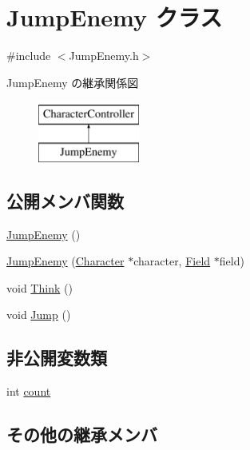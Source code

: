 \hypertarget{class_jump_enemy}{\section{Jump\+Enemy クラス}
\label{class_jump_enemy}
}


{\ttfamily \#include $<$Jump\+Enemy.\+h$>$}

Jump\+Enemy の継承関係図\begin{figure}[H]
\begin{center}
\leavevmode
\includegraphics[height=2.000000cm]{class_jump_enemy}
\end{center}
\end{figure}
\subsection*{公開メンバ関数}
\begin{DoxyCompactItemize}
\item 
\hyperlink{class_jump_enemy_a553e827686bca768755f5fb6fe88a425}{Jump\+Enemy} ()
\item 
\hyperlink{class_jump_enemy_ac6a931ac974acd22e7d8a31aa10d1a19}{Jump\+Enemy} (\hyperlink{class_character}{Character} $\ast$character, \hyperlink{class_field}{Field} $\ast$field)
\item 
void \hyperlink{class_jump_enemy_abd7019f8b333e710c1bb65b1b599182c}{Think} ()
\item 
void \hyperlink{class_jump_enemy_a4ab905f21c4526c75a1ae6a436cca601}{Jump} ()
\end{DoxyCompactItemize}
\subsection*{非公開変数類}
\begin{DoxyCompactItemize}
\item 
int \hyperlink{class_jump_enemy_acdb8b9943cefb60493cc8ed9b47d6304}{count}
\end{DoxyCompactItemize}
\subsection*{その他の継承メンバ}


